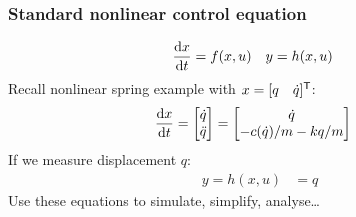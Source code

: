 \documentclass{beamer-control}
\begin{document}
\begin{frame}
\frametitle{Standard nonlinear control equation}
\begin{align}
\frac{\mathrm{d} x}{\mathrm{d} t} &= f(x,u) & y &= h(x,u)
\end{align}
Recall nonlinear spring example with $x = [q\quad \dot q]^{\mathsf T}$:
\begin{align}
\frac{\mathrm{d} x}{\mathrm{d} t} &= \begin{bmatrix}\dot q\\\ddot q\end{bmatrix} = \begin{bmatrix}\dot q\\- c(\dot q)/m - kq/m\end{bmatrix}
\end{align}
If we measure displacement $q$:
\begin{align}
y = h(x,u) &= q
\end{align}
Use these equations to simulate, simplify, analyse\dots

\end{frame}



\SUMMARYFRAME
\FINALE
\end{document}

